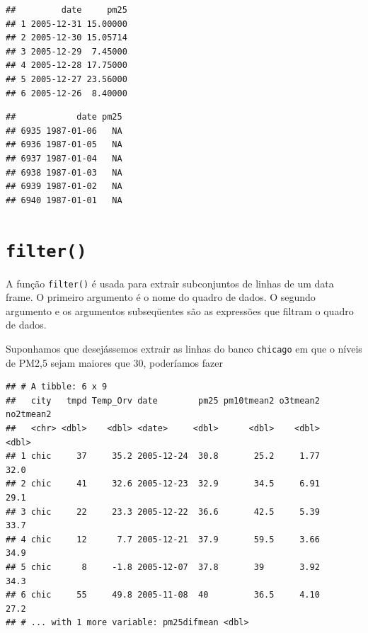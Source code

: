 \documentclass[a4paper]{book}
\newenvironment{Shaded}{\begin{snugshade}}{\end{snugshade}}
\newcommand{\DecValTok}[1]{\textcolor[rgb]{0.00,0.00,0.81}{#1}}
\newcommand{\KeywordTok}[1]{\textcolor[rgb]{0.13,0.29,0.53}{\textbf{#1}}}
\newcommand{\NormalTok}[1]{#1}
\newcommand{\OperatorTok}[1]{\textcolor[rgb]{0.81,0.36,0.00}{\textbf{#1}}}
\newcommand{\StringTok}[1]{\textcolor[rgb]{0.31,0.60,0.02}{#1}}
\begin{document}
\begin{verbatim}
##         date     pm25
## 1 2005-12-31 15.00000
## 2 2005-12-30 15.05714
## 3 2005-12-29  7.45000
## 4 2005-12-28 17.75000
## 5 2005-12-27 23.56000
## 6 2005-12-26  8.40000
\end{verbatim}

\begin{Shaded}
\end{Shaded}

\begin{verbatim}
##            date pm25
## 6935 1987-01-06   NA
## 6936 1987-01-05   NA
## 6937 1987-01-04   NA
## 6938 1987-01-03   NA
## 6939 1987-01-02   NA
## 6940 1987-01-01   NA
\end{verbatim}

\hypertarget{filter}{%
\section{\texorpdfstring{\texttt{filter()}}{filter()}}\label{filter}}

A função \texttt{filter()} é usada para extrair subconjuntos de linhas de um data frame. O primeiro argumento é o nome do quadro de dados. O segundo argumento e os argumentos subseqüentes são as expressões que filtram o quadro de dados.

Suponhamos que desejássemos extrair as linhas do banco \texttt{chicago} em que o níveis de PM2,5 sejam maiores que 30, poderíamos fazer

\begin{Shaded}
\end{Shaded}

\begin{verbatim}
## # A tibble: 6 x 9
##   city   tmpd Temp_Orv date        pm25 pm10tmean2 o3tmean2 no2tmean2
##   <chr> <dbl>    <dbl> <date>     <dbl>      <dbl>    <dbl>     <dbl>
## 1 chic     37     35.2 2005-12-24  30.8       25.2     1.77      32.0
## 2 chic     41     32.6 2005-12-23  32.9       34.5     6.91      29.1
## 3 chic     22     23.3 2005-12-22  36.6       42.5     5.39      33.7
## 4 chic     12      7.7 2005-12-21  37.9       59.5     3.66      34.9
## 5 chic      8     -1.8 2005-12-07  37.8       39       3.92      34.3
## 6 chic     55     49.8 2005-11-08  40         36.5     4.10      27.2
## # ... with 1 more variable: pm25difmean <dbl>
\end{verbatim}
\end{document}
